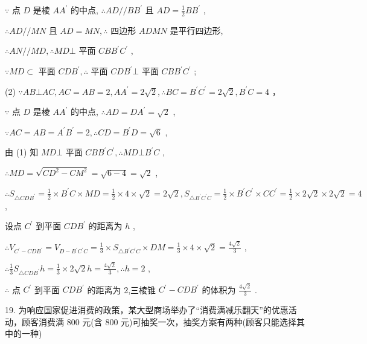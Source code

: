 \documentclass[10pt]{article}
\begin{document}
\(\because\) 点 \(D\) 是棱 \(A{A}^{\prime }\) 的中点, \(\therefore {AD}//B{B}^{\prime }\) 且 \({AD} = \frac{1}{2}B{B}^{\prime }\) ,

\(\therefore {AD}//{MN}\) 且 \({AD} = {MN},\therefore\) 四边形 \({ADMN}\) 是平行四边形,

\(\therefore {AN}//{MD},\therefore {MD} \bot\) 平面 \({CB}{B}^{\prime }{C}^{\prime }\) ,

\(\because {MD} \subset\) 平面 \({CD}{B}^{\prime },\therefore\) 平面 \({CD}{B}^{\prime } \bot\) 平面 \({CB}{B}^{\prime }{C}^{\prime }\) ;

(2) \(\because {AB} \bot  {AC},{AC} = {AB} = 2,A{A}^{\prime } = {2\sqrt{2}},\therefore {BC} = {B}^{\prime }{C}^{\prime } = {2\sqrt{2}},{B}^{\prime }C = 4\) ，

\(\because\) 点 \(D\) 是棱 \(A{A}^{\prime }\) 的中点, \(\therefore {AD} = D{A}^{\prime } = \sqrt{2}\) ,

\(\because {AC} = {AB} = {A}^{\prime }{B}^{\prime } = 2,\therefore {CD} = {B}^{\prime }D = \sqrt{6}\) ,

由 (1) 知 \({MD} \bot\) 平面 \({CB}{B}^{\prime }{C}^{\prime },\therefore {MD} \bot  {B}^{\prime }C\) ,

\(\therefore {MD} = \sqrt{C{D}^{2} - C{M}^{2}} = \sqrt{6 - 4} = \sqrt{2}\) ,

\(\therefore {S}_{\bigtriangleup {CD}{B}^{\prime }} = \frac{1}{2} \times  {B}^{\prime }C \times  {MD} = \frac{1}{2} \times  4 \times  \sqrt{2} = 2\sqrt{2},{S}_{\bigtriangleup {{B}^{\prime }{C}^{\prime }C}} = \frac{1}{2} \times  {B}^{\prime }{C}^{\prime } \times  {C{C}^{\prime }} = \frac{1}{2} \times  2\sqrt{2} \times  2\sqrt{2} = 4\) ,

设点 \({C}^{\prime }\) 到平面 \({CD}{B}^{\prime }\) 的距离为 \(h\) ,

\(\therefore {V}_{{C}^{\prime } - {CD}{B}^{\prime }} = {V}_{D - {B}^{\prime }{C}^{\prime }C} = \frac{1}{3} \times  {S}_{\bigtriangleup {B}^{\prime }{C}^{\prime }C} \times  {DM} = \frac{1}{3} \times  4 \times  \sqrt{2} = \frac{4\sqrt{2}}{3}\) ,

\(\therefore \frac{1}{3}{S}_{\bigtriangleup {CD}{B}^{\prime }}h = \frac{1}{3} \times  2\sqrt{2}h = \frac{4\sqrt{2}}{3},\therefore h = 2\) ,

\(\therefore\) 点 \({C}^{\prime }\) 到平面 \({CD}{B}^{\prime }\) 的距离为 2,三棱锥 \({C}^{\prime } - {CD}{B}^{\prime }\) 的体积为 \(\frac{4\sqrt{2}}{3}\) .

19. 为响应国家促进消费的政策，某大型商场举办了“消费满减乐翻天”的优惠活动，顾客消费满 800 元(含 800 元)可抽奖一次，抽奖方案有两种(顾客只能选择其中的一种)
\end{document}
